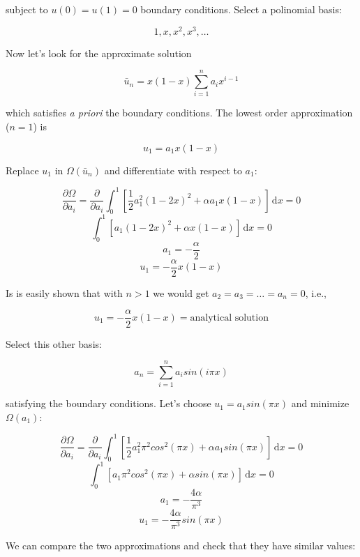 \documentclass{article}
\begin{document}
subject to \(u(0)=u(1)=0\) boundary conditions. Select a polinomial
basis:

\[
1, x, x^2, x^3, \ldots
\]

Now let's look for the approximate solution

\[
\bar{u}_n = x(1-x) \sum^{n}_{i=1}a_i x^{i-1}
\]

which satisfies \emph{a priori} the boundary conditions. The lowest
order approximation (\(n = 1\)) is

\[
u_1 = a_1 x (1-x)
\]

Replace \(u_1\) in \(\Omega(\bar{u}_n)\) and differentiate with respect
to \(a_1\):

\[
\frac{\partial \Omega}{\partial a_i} = \frac{\partial}{\partial a_i} \int^1_0\left[\frac{1}{2} a^{2}_{1} (1-2x)^2 + \alpha a_1 x (1-x) \right] \, \mathrm{d}x = 0 
\] \[
\int^1_0\left[a_1 (1-2x)^2 + \alpha x (1-x) \right] \, \mathrm{d}x = 0
\] \[
a_1 = -\frac{\alpha}{2}
\] \[
u_1 = -\frac{\alpha}{2}x(1-x)
\]

Is is easily shown that with \(n>1\) we would get
\(a_2=a_3=\ldots=a_n=0\), i.e.,

\[
u_1 = -\frac{\alpha}{2}x(1-x)=\text{analytical solution}
\]

Select this other basis:

\[
a_n = \sum^n_{i=1} a_i sin(i \pi x)
\]

satisfying the boundary conditions. Let's choose
\(u_1 = a_1 sin(\pi x)\) and minimize \(\Omega(a_1)\):

\[
\frac{\partial \Omega}{\partial a_i} = \frac{\partial}{\partial a_i} \int^1_0\left[\frac{1}{2} a^{2}_{1} \pi^2 cos^2(\pi x) + \alpha a_1 sin(\pi x) \right] \, \mathrm{d}x = 0 
\] \[
\int^1_0\left[a_{1} \pi^2 cos^2(\pi x) + \alpha sin(\pi x) \right] \, \mathrm{d}x = 0 
\] \[
a_1 = -\frac{4 \alpha}{\pi^3}
\] \[
u_1 = -\frac{4 \alpha}{\pi^3}sin(\pi x)
\]

We can compare the two approximations and check that they have similar
values:
\end{document}
